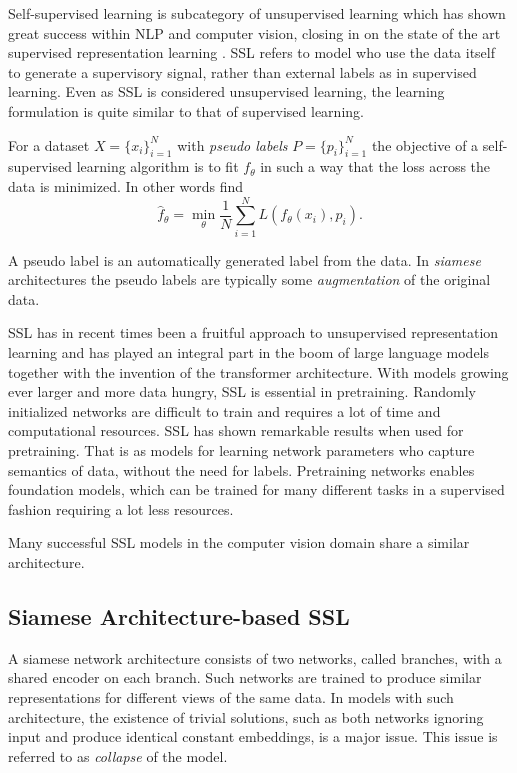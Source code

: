 \documentclass[../../thesis.tex]{subfiles}
\begin{document}
Self-supervised learning is subcategory of unsupervised learning which has shown great success within NLP and computer vision, closing in on the state of the art supervised representation learning \cite{bardes2022vicreg} \cite{zbontar2021barlow}. SSL refers to model who use the data itself to generate a supervisory signal, rather than external labels as in supervised learning. Even as SSL is considered unsupervised learning, the learning formulation is quite similar to that of supervised learning.\newline

For a dataset $X = \{x_i\}_{i=1}^N$ with \textit{pseudo labels} $P = \{p_i\}_{i=1}^N$ the objective of a self-supervised learning algorithm is to fit $f_\theta$ in such a way that the loss across the data is minimized. In other words find 
\begin{equation}
    \widehat{f}_\theta = \min_\theta \frac{1}{N} \sum_{i=1}^N L(f_\theta(x_i),p_i).
\end{equation}

A pseudo label is an automatically generated label from the data. In \textit{siamese} architectures the pseudo labels are typically some \textit{augmentation} of the original data.\newline

SSL has in recent times been a fruitful approach to unsupervised representation learning and has played an integral part in the boom of large language models together with the invention of the transformer architecture. With models growing ever larger and more data hungry, SSL is essential in pretraining. Randomly initialized networks are difficult to train and requires a lot of time and computational resources. SSL has shown remarkable results when used for pretraining. That is as models for learning network parameters who capture semantics of data, without the need for labels. Pretraining networks enables foundation models, which can be trained for many different tasks in a supervised fashion requiring a lot less resources.\newline

Many successful SSL models in the computer vision domain share a similar architecture.

\subsection{Siamese Architecture-based SSL }
A siamese network architecture \cite{siamese} consists of two networks, called branches, with a shared encoder on each branch. Such networks are trained to produce similar representations for different views of the same data. In models with such architecture, the existence of trivial solutions, such as both networks ignoring input and produce identical constant embeddings, is a major issue. This issue is referred to as \textit{collapse} of the model.\newline
\end{document}

